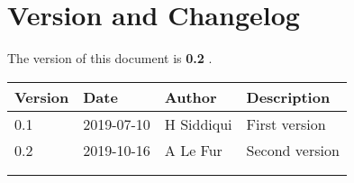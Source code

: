 \section{Version and Changelog}

The version of this document is {\bf 0.2} .

\begin{table}[H]
    \begin{tabular}{|l|l|l|p{10cm}| }
    \hline
    {\bf Version} & {\bf Date} & {\bf Author} & {\bf Description} \\ \hline
    0.1 & 2019-07-10 & H Siddiqui & First version \\ \hline
    0.2 & 2019-10-16 & A Le Fur & Second version \\ \hline
    \rowcolor[HTML]{EFEFEF} 
     &  &  &  \\ \hline
     &  &  &  \\ \hline
    \end{tabular}
\end{table}
